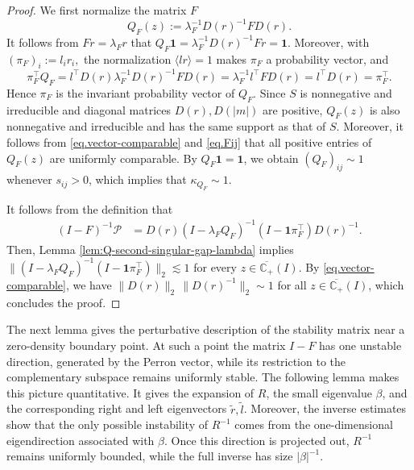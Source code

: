 \documentclass[11pt,twoside, a4paper]{article}
\numberwithin{equation}{section}
\numberwithin{figure}{section}
\theoremstyle{plain} %
\theoremstyle{definition}
\theoremstyle{remark}
\newcommand{\1} {\mspace{1 mu}}
\newcommand{\2} {\mspace{2 mu}}
\newcommand{\C} {{\mathbb{C}}}
\begin{document}
\begin{proof}
We first normalize the matrix $F$
\begin{equation}\label{eq:F-normalization}
  Q_F(z):= \lambda_F^{-1}D(r)^{-1}FD(r).
\end{equation}
It follows from \(Fr=\lambda_F r\) that 
$
  Q_F\mathbf 1=\lambda_F^{-1}D(r)^{-1}Fr=\mathbf 1.
$
Moreover, with
$
  (\pi_F)_i:=l_i r_i,
$
the normalization \(\langle lr\rangle=1\) makes \(\pi_F\) a probability vector, and
\[
  \pi_F^\top Q_F=l^\top D(r)\lambda_F^{-1}D(r)^{-1}FD(r)=\lambda_F^{-1}l^\top FD(r)=l^\top D(r)=\pi_F^\top.
\]
Hence \(\pi_F\) is the invariant probability vector of \(Q_F\).
Since \(S\) is nonnegative and irreducible and  diagonal matrices $D(r),D(|m|)$ are positive, \(Q_F(z)\) is also nonnegative and irreducible and has the same support as that of $S$.
Moreover, it follows from \eqref{eq.vector-comparable} and \eqref{eq.Fij} that all positive entries of \(Q_F(z)\) are uniformly comparable. 
By \(Q_F\mathbf 1=\mathbf 1\), we obtain
$(Q_F)_{ij}\sim 1$ whenever $s_{ij}>0$, which implies that $\kappa_{Q_F}\sim 1$.

It follows from the definition that
\begin{align*}
  (I-F)^{-1}\mathcal{P}&=D(r)(I-\lambda_F Q_F)^{-1}(I-\mathbf 1\pi_F^\top)D(r)^{-1}.
\end{align*}
Then, Lemma \ref{lem:Q-second-singular-gap-lambda} implies $\|(I-\lambda_F Q_F)^{-1}(I-\mathbf 1\pi_F^\top)\|_2\lesssim 1$ for every $z\in\overline{\C_+}(I)$.
By \eqref{eq.vector-comparable}, we have 
$
\|D(r)\|_2\,\|D(r)^{-1}\|_2\sim 1
$
for all $z\in\overline{\C_+}(I)$,
which concludes the proof.
\end{proof}
\bigskip
The next lemma gives the perturbative description of the stability matrix near
a zero-density boundary point. At such a point the matrix \(I-F\) has one
unstable direction, generated by the Perron vector, while its restriction
to the complementary subspace remains uniformly stable. 
The following lemma makes this picture quantitative. It gives the expansion of \(R\),
the small eigenvalue \(\beta\), and the corresponding right and left
eigenvectors $\tilde{r},\tilde{l}$. Moreover, the inverse estimates show that
the only possible instability of \(R^{-1}\) comes from the one-dimensional
eigendirection associated with \(\beta\). Once this direction is projected out,
\(R^{-1}\) remains uniformly bounded, while the full inverse has size
\(|\beta|^{-1}\).
\end{document}
